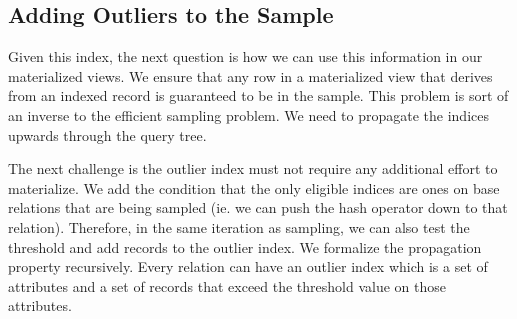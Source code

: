 \subsection{Adding Outliers to the Sample}
Given this index, the next question is how we can use this information in our materialized views.
We ensure that any row in a materialized view that derives from an indexed record is guaranteed to be in the sample.
This problem is sort of an inverse to the efficient sampling problem.
We need to propagate the indices upwards through the query tree.

The next challenge is the outlier index must not require any additional effort to materialize.
We add the condition that the only eligible indices are ones on base relations that are being sampled (ie. we can push the hash operator down to that relation).
Therefore, in the same iteration as sampling, we can also test the threshold and add records to the outlier index. 
We formalize the propagation property recursively. 
Every relation can have an outlier index which is a set of attributes and a set of records that exceed the threshold value on those attributes.


